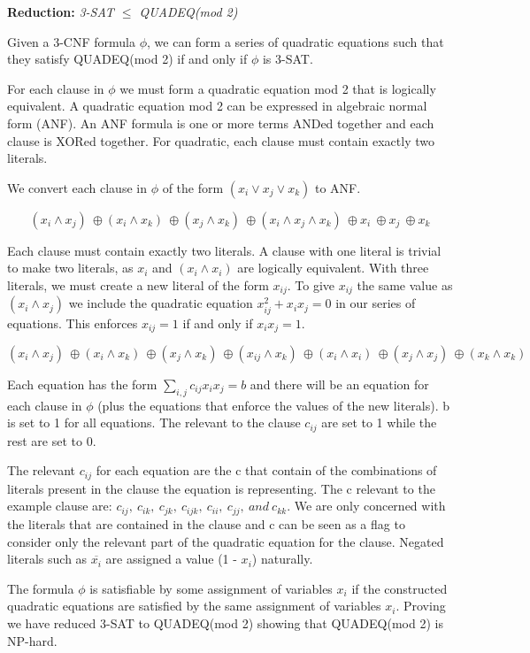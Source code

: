 \documentclass[11pt]{article}
\begin{document}
\textbf{Reduction:} \textit{3-SAT $\leq$ QUADEQ(mod 2)}

Given a 3-CNF formula $\phi$, we can form a series of quadratic equations such that they satisfy QUADEQ(mod 2) if and only if $\phi$ is 3-SAT.

For each clause in $\phi$ we must form a quadratic equation mod 2 that is logically equivalent. A quadratic equation mod 2 can be expressed in algebraic normal form (ANF). An ANF formula is one or more terms ANDed together and each clause is XORed together. For quadratic, each clause must contain exactly two literals.

	We convert each clause in $\phi$ of the form $(x_i \lor x_j \lor x_k)$ to ANF.
	
	$$(x_i \land x_j) \ \oplus (x_i \land x_k) \ \oplus (x_j \land x_k) \ \oplus (x_i \land x_j \land x_k) \ \oplus x_i \ \oplus x_j \ \oplus x_k$$
	
	Each clause must contain exactly two literals. A clause with one literal is trivial to make two literals, as $x_i$ and $(x_i \land x_i)$ are logically equivalent. With three literals, we must create a new literal of the form $x_{ij}$. To give $x_{ij}$ the same value as $(x_i \land x_j)$ we include the quadratic equation $x_{ij}^2 + x_{i}x_{j} = 0$ in our series of equations. This enforces $x_{ij} = 1$ if and only if $x_ix_j = 1$.
	
	$$(x_i \land x_j) \ \oplus (x_i \land x_k) \ \oplus (x_j \land x_k) \ \oplus (x_{ij} \land x_k) \ \oplus (x_i \land x_i) \ \oplus (x_j \land x_j) \ \oplus (x_k \land x_k)$$
	
	Each equation has the form $\sum_{i,j} c_{ij}x_ix_j = b$ and there will be an equation for each clause in $\phi$ (plus the equations that enforce the values of the new literals). b is set to 1 for all equations. The relevant to the clause $c_{ij}$ are set to 1 while the rest are set to 0. 
	
	The relevant $c_{ij}$ for each equation are the c that contain of the combinations of literals present in the clause the equation is representing. The c relevant to the example clause are: $c_{ij}, \ c_{ik}, \ c_{jk}, \ c_{ijk}, \ c_{ii}, \ c_{jj}, \ and \ c_{kk}$. We are only concerned with the literals that are contained in the clause and c can be seen as a flag to consider only the relevant part of the quadratic equation for the clause. Negated literals such as $\overline{x_i}$ are assigned a value (1 - $x_i$) naturally.
	
	The formula $\phi$ is satisfiable by some assignment of variables $x_i$ if the constructed quadratic equations are satisfied by the same assignment of variables $x_i$. Proving we have reduced 3-SAT to QUADEQ(mod 2) showing that QUADEQ(mod 2) is NP-hard.
	
\end{document}
